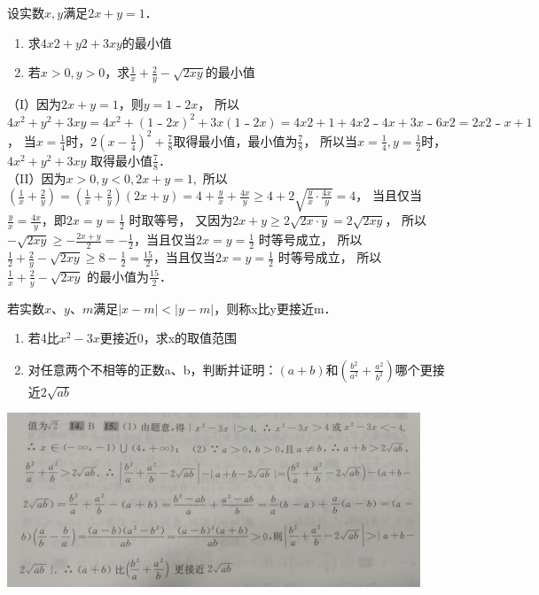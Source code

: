 \documentclass[11pt,a4paper]{ctexbook}
\begin{document}
\par
\begin{problem}
    设实数$x,y$满足$2x+y=1$．
    \begin{enumerate}
        \item 求$4x2+y2+3xy$的最小值
        \item 若$x>0,y>0$，求$\displaystyle \frac{1}{x}+\frac{2}{y}-\sqrt{2xy}$的最小值
    \end{enumerate}
    \begin{jiexi}
        （I）因为$2x+y=1$，则$y=1﹣2x$，
所以$4x^2+y^2+3xy=4x^2+(1﹣2x)^2+3x(1﹣2x)=4x2+1+4x2﹣4x+3x﹣6x2=2x2﹣x+1$，
当$x=\frac{1}{4}$时，$\displaystyle 2(x-\frac{1}{4})^2+\frac{7}{8}$取得最小值，最小值为$\frac{7}{8}$，
所以当$\displaystyle x=\frac{1}{4},y=\frac{1}{2}$时，$4x^2+y^2+3xy$ 取得最小值$\displaystyle \frac{7}{8}$．\\
（II）因为$x>0,y<0,2x+y=1,$
所以$\displaystyle (\frac{1}{x}+\frac{2}{y})=(\frac{1}{x}+\frac{2}{y})(2x+y)=4+\frac{y}{x}+\frac{4x}{y}\ge4+2\sqrt{\frac{y}{x}\cdot\frac{4x}{y}}=4$，
当且仅当 $\displaystyle \frac{y}{x}=\frac{4x}{y}$，即$\displaystyle 2x=y=\frac{1}{2}$ 时取等号，
又因为$2x+y\ge2\sqrt{2x\cdot y}=2\sqrt{2xy}$，
所以$\displaystyle -\sqrt{2xy}\ge -\frac{2x+y}{2}=-\frac{1}{2}$，当且仅当$\displaystyle 2x=y=\frac{1}{2}$ 时等号成立，
所以$\displaystyle \frac{1}{2}+\frac{2}{y}-\sqrt{2xy}\ge8-\frac{1}{2}=\frac{15}{2}$，当且仅当$2x=y=\frac{1}{2}$ 时等号成立，
所以$\displaystyle \frac{1}{x}+\frac{2}{y}-\sqrt{2xy}$ 的最小值为$\displaystyle \frac{15}{2}$．
    \end{jiexi}
\end{problem}

\par
\begin{problem}
    若实数$x、y、m$满足$|x-m|<|y-m|$，则称x比y更接近m．
    \begin{enumerate}
        \item 若4比$x^2-3x$更接近0，求x的取值范围
        \item 对任意两个不相等的正数a、b，判断并证明：$(a+b)$和$\displaystyle (\frac{b^2}{a^2}+\frac{a^2}{b^2})$哪个更接近$2\sqrt{ab}$
    \end{enumerate}
    \begin{jiexi}
        \includegraphics[scale=1.3]{pictures/image2.png}\\
    \end{jiexi}
\end{problem}
\end{document}
